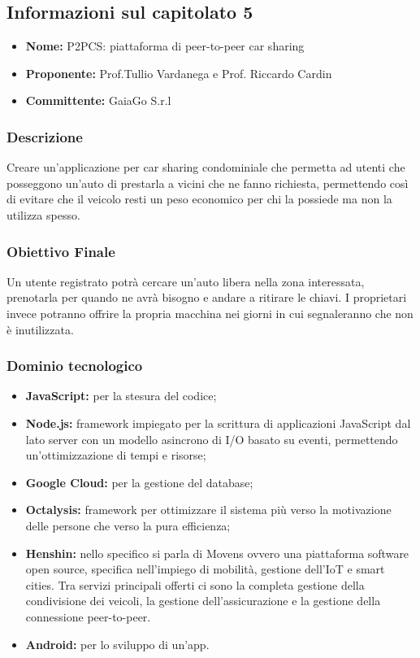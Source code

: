 \subsection{Informazioni sul capitolato 5}
\begin{itemize}
\item \textbf{Nome:} P2PCS: piattaforma di peer-to-peer car sharing
\item \textbf{Proponente:} Prof.Tullio Vardanega e Prof.
Riccardo Cardin
	\item \textbf{Committente:} GaiaGo S.r.l
\end{itemize}
\subsubsection{Descrizione}
Creare un'applicazione per car sharing condominiale che permetta ad utenti che posseggono un'auto di prestarla a vicini che ne fanno richiesta, permettendo così di evitare che il veicolo resti un peso economico per chi la possiede ma non la utilizza spesso.
\subsubsection{Obiettivo Finale}
Un utente registrato potrà cercare un'auto libera nella zona interessata, prenotarla per quando ne avrà bisogno e andare a ritirare le chiavi. I proprietari invece potranno offrire la propria macchina nei giorni in cui segnaleranno che non è inutilizzata.
\subsubsection{Dominio tecnologico}
\begin{itemize}
	\item \textbf{JavaScript:} per la stesura del codice;
	\item \textbf{Node.js:} framework impiegato per la scrittura di applicazioni JavaScript dal lato server con un modello asincrono di I/O basato su eventi, permettendo un'ottimizzazione di tempi e risorse;
	\item \textbf{Google Cloud:} per la gestione del database;
	\item \textbf{Octalysis:} framework per ottimizzare il sistema più verso la motivazione delle persone che verso la pura efficienza;
	\item \textbf{Henshin:} nello specifico si parla di Movens ovvero una piattaforma software open source, specifica nell'impiego di mobilità, gestione dell'IoT e smart cities. Tra servizi principali offerti ci sono la completa gestione della condivisione dei veicoli, la gestione dell'assicurazione e la gestione della connessione peer-to-peer.
	\item \textbf{Android:} per lo sviluppo di un'app.
\end{itemize}

